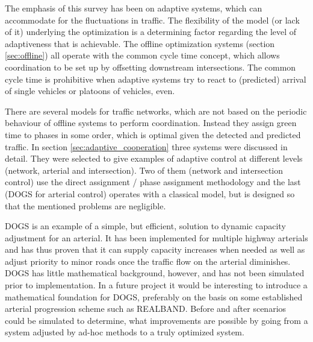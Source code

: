 \label{sec:conclusion}

The emphasis of this survey has been on adaptive systems, which can
accommodate for the fluctuations in traffic.  The flexibility of the
model (or lack of it) underlying the optimization is a determining factor
regarding the level of adaptiveness that is achievable. The offline
optimization systems (section \ref{sec:offline}) all operate with the
common cycle time concept, which allows coordination to be set up by
offsetting downstream intersections. The common cycle time is
prohibitive when adaptive systems try to react to (predicted) arrival
of single vehicles or platoons of vehicles, even.

There are several models for traffic networks, which are not based
on the periodic behaviour of offline systems to perform
coordination. Instead they assign green time to phases in some order,
which is optimal given the detected and predicted traffic.  In section
\ref{sec:adaptive_cooperation} three systems were discussed in
detail. They were selected to give examples of adaptive control at
different levels (network, arterial and intersection). Two of them
(network and intersection control) use the direct assignment / phase
assignment methodology and the last (DOGS for arterial control)
operates with a classical model, but is designed so that the mentioned
problems are negligible.

DOGS is an example of a simple, but efficient, solution to dynamic
capacity adjustment for an arterial. It has been implemented for
multiple highway arterials and has thus proven that it can supply
capacity increases when needed as well as adjust priority to minor
roads once the traffic flow on the arterial diminishes.  DOGS has little
mathematical background, however, and has not been simulated prior to
implementation.  In a future project it would be interesting to
introduce a mathematical foundation for DOGS, preferably on the basis
on some established arterial progression scheme such as
REALBAND. Before and after scenarios could be simulated to determine,
what improvements are possible by going from a system adjusted by
ad-hoc methods to a truly optimized system.
